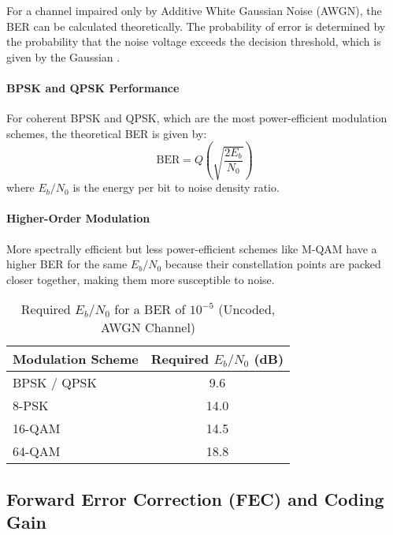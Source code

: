 For a channel impaired only by Additive White Gaussian Noise (AWGN), the BER can be calculated theoretically. The probability of error is determined by the probability that the noise voltage exceeds the decision threshold, which is given by the Gaussian .

\paragraph{BPSK and QPSK Performance}
For coherent BPSK and QPSK, which are the most power-efficient modulation schemes, the theoretical BER is given by:
\begin{equation}
    \text{BER} = Q\left(\sqrt{\frac{2E_b}{N_0}}\right)
\end{equation}
where $E_b/N_0$ is the energy per bit to noise density ratio.

\paragraph{Higher-Order Modulation}
More spectrally efficient but less power-efficient schemes like M-QAM have a higher BER for the same $E_b/N_0$ because their constellation points are packed closer together, making them more susceptible to noise.

\begin{table}[H]
    \centering
    \caption{Required $E_b/N_0$ for a BER of $10^{-5}$ (Uncoded, AWGN Channel)}
    \label{tab:ber-reqs-uncoded}
    \begin{tabular}{@{}lc@{}}
        \toprule
        \tableheaderfont Modulation Scheme & \tableheaderfont Required $E_b/N_0$ (dB) \\
        \midrule
        BPSK / QPSK & 9.6 \\
        8-PSK & 14.0 \\
        16-QAM & 14.5 \\
        64-QAM & 18.8 \\
        \bottomrule
    \end{tabular}
\end{table}


\subsection{Forward Error Correction (FEC) and Coding Gain}

